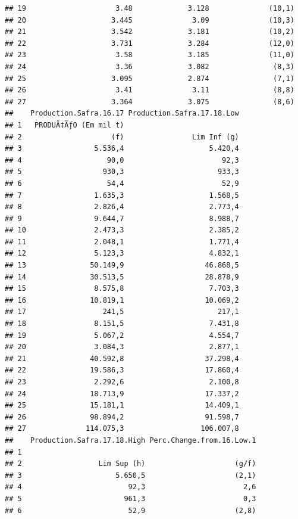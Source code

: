 \documentclass[
]{book}
\begin{document}
\begin{verbatim}
## 19                     3.48             3.128              (10,1)
## 20                    3.445              3.09              (10,3)
## 21                    3.542             3.181              (10,2)
## 22                    3.731             3.284              (12,0)
## 23                     3.58             3.185              (11,0)
## 24                     3.36             3.082               (8,3)
## 25                    3.095             2.874               (7,1)
## 26                     3.41              3.11               (8,8)
## 27                    3.364             3.075               (8,6)
##    Production.Safra.16.17 Production.Safra.17.18.Low
## 1   PRODUÃ‡ÃƒO (Em mil t)                           
## 2                     (f)                Lim Inf (g)
## 3                 5.536,4                    5.420,4
## 4                    90,0                       92,3
## 5                   930,3                      933,3
## 6                    54,4                       52,9
## 7                 1.635,3                    1.568,5
## 8                 2.826,4                    2.773,4
## 9                 9.644,7                    8.988,7
## 10                2.473,3                    2.385,2
## 11                2.048,1                    1.771,4
## 12                5.123,3                    4.832,1
## 13               50.149,9                   46.868,5
## 14               30.513,5                   28.878,9
## 15                8.575,8                    7.703,3
## 16               10.819,1                   10.069,2
## 17                  241,5                      217,1
## 18                8.151,5                    7.431,8
## 19                5.067,2                    4.554,7
## 20                3.084,3                    2.877,1
## 21               40.592,8                   37.298,4
## 22               19.586,3                   17.860,4
## 23                2.292,6                    2.100,8
## 24               18.713,9                   17.337,2
## 25               15.181,1                   14.409,1
## 26               98.894,2                   91.598,7
## 27              114.075,3                  106.007,8
##    Production.Safra.17.18.High Perc.Change.from.16.Low.1
## 1                                                       
## 2                  Lim Sup (h)                     (g/f)
## 3                      5.650,5                     (2,1)
## 4                         92,3                       2,6
## 5                        961,3                       0,3
## 6                         52,9                     (2,8)

\end{verbatim}
\end{document}
